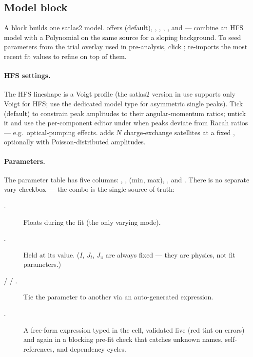 \subsection{Model block}

A  block builds one satlas2 model.  offers
 (default), , ,
, , and
 --- combine an HFS model with a Polynomial on the
same source for a sloping background. To seed parameters from the
trial overlay used in pre-analysis, click
;  re-imports
the most recent fit values to refine on top of them.

\paragraph{HFS settings.}
The HFS lineshape is a Voigt profile (the satlas2 version in use
supports only Voigt for HFS; use the dedicated 
model type for asymmetric single peaks). Tick  (default)
to constrain peak amplitudes to their angular-momentum ratios;
untick it and use the per-component editor under
 when peaks deviate from Racah ratios ---
e.g.\ optical-pumping effects.  adds $N$
charge-exchange satellites at a fixed , optionally with
Poisson-distributed amplitudes.

\paragraph{Parameters.}
The parameter table has five columns: , ,
 (min, max), , and . There is
no separate vary checkbox --- the  combo is the single
source of truth:

\begin{description}
    \item[.] Floats during the fit (the only varying mode).
    \item[.] Held at its value. ($I$, $J_l$, $J_u$ are
        always fixed --- they are physics, not fit parameters.)
    \item[ /  / .] Tie the
        parameter to another via an auto-generated expression.
    \item[.] A free-form expression typed in the
         cell, validated live (red tint on errors)
        and again in a blocking pre-fit check that catches unknown
        names, self-references, and dependency cycles.
\end{description}

